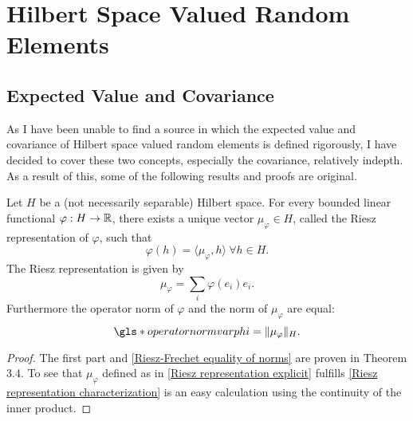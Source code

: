 \section{Hilbert Space Valued Random Elements}

\subsection{Expected Value and Covariance}

As I have been unable to find a source in which the expected value and covariance of Hilbert space valued random elements is defined rigorously, I have decided to cover these two concepts, especially the covariance, relatively indepth. As a result of this, some of the following results and proofs are original.

\begin{thm} \label{thm:riesz}
    Let $H$ be a (not necessarily separable) Hilbert space. For every bounded linear functional $\varphi: H \to \mathbb{R}$, there exists a unique vector $\mu_\varphi \in H$, called the Riesz representation of $\varphi$, such that
    \begin{equation} \label{Riesz representation characterization} \varphi(h) = \langle \mu_\varphi, h \rangle \ \forall h \in H. \end{equation}
    The Riesz representation is given by
    \begin{equation} \label{Riesz representation explicit}
        \mu_\varphi = \sum\limits_i \varphi(e_i) e_i. 
    \end{equation}
    Furthermore the operator norm of $\varphi$ and the norm of $\mu_\varphi$ are equal:
    \begin{equation} \label{Riesz-Frechet equality of norms}
        \gls*{operatornormvarphi} = \| \mu_\varphi \|_H.
    \end{equation}
\end{thm}
\begin{proof}
    The first part and \eqref{Riesz-Frechet equality of norms} are proven in \cite{conway2019course} Theorem 3.4. To see that $\mu_\varphi$ defined as in \eqref{Riesz representation explicit} fulfills \eqref{Riesz representation characterization} is an easy calculation using the continuity of the inner product.
\end{proof}

